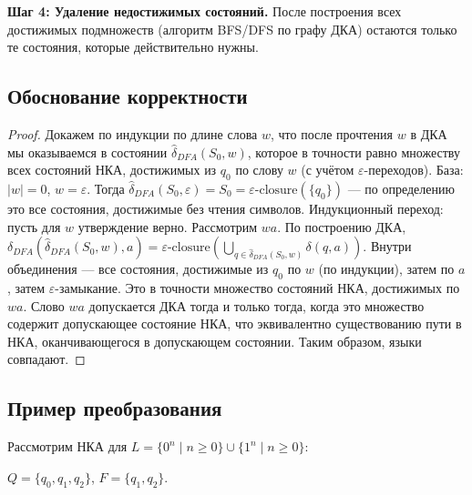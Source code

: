 \documentclass[12pt,a4paper]{article}
\theoremstyle{definition}
\newcommand{\emptystring}{\varepsilon}
\begin{document}
\textbf{Шаг 4: Удаление недостижимых состояний.} После построения всех достижимых подмножеств (алгоритм BFS/DFS по графу ДКА) остаются только те состояния, которые действительно нужны.

\subsection{Обоснование корректности}

\begin{proof}
Докажем по индукции по длине слова $w$, что после прочтения $w$ в ДКА мы оказываемся в состоянии $\hat\delta_{DFA}(S_0, w)$, которое в точности равно множеству всех состояний НКА, достижимых из $q_0$ по слову $w$ (с учётом $\varepsilon$-переходов).  
База: $|w|=0$, $w=\emptystring$. Тогда $\hat\delta_{DFA}(S_0,\emptystring)=S_0 = \varepsilon\text{-closure}(\{q_0\})$ — по определению это все состояния, достижимые без чтения символов.  
Индукционный переход: пусть для $w$ утверждение верно. Рассмотрим $wa$. По построению ДКА, $\delta_{DFA}( \hat\delta_{DFA}(S_0,w), a) = \varepsilon\text{-closure}\left(\bigcup_{q\in \hat\delta_{DFA}(S_0,w)} \delta(q,a)\right)$. Внутри объединения — все состояния, достижимые из $q_0$ по $w$ (по индукции), затем по $a$, затем $\varepsilon$-замыкание. Это в точности множество состояний НКА, достижимых по $wa$.  
Слово $wa$ допускается ДКА тогда и только тогда, когда это множество содержит допускающее состояние НКА, что эквивалентно существованию пути в НКА, оканчивающегося в допускающем состоянии. Таким образом, языки совпадают.
\end{proof}

\subsection{Пример преобразования}

Рассмотрим НКА для $L = \{0^n \mid n\ge 0\} \cup \{1^n \mid n\ge 0\}$:
\begin{center}
\end{center}
$Q=\{q_0,q_1,q_2\}$, $F=\{q_1,q_2\}$.
\end{document}
